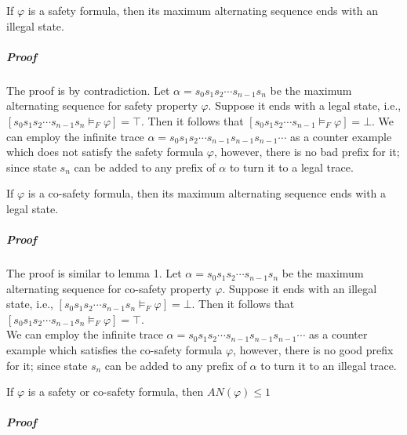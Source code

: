 

\begin{lemma}

If $\varphi$ is a safety formula, then its maximum alternating sequence ends with an illegal state. 

\end{lemma}

\subparagraph{Proof}
The proof is by contradiction. Let $\alpha = s_0s_1s_2 \cdots s_{n-1} s_n $ be the maximum alternating sequence for safety property $\varphi$. Suppose it ends with a legal state, i.e., $[s_0s_1s_2 \cdots s_{n-1} s_n \models_F \varphi] = \top$. Then it follows that $[s_0s_1s_2 \cdots s_{n-1} \models_F \varphi] = \bot$. We can employ the infinite trace $\alpha = s_0 s_1 s_2 \cdots s_{n-1} s_{n-1} s_{n-1} \cdots$ as a counter example which does not satisfy the safety formula $\varphi$, however, there is no bad prefix for it; since state $s_n$ can be added to any prefix of $\alpha$ to turn it to a legal trace.  

\begin{lemma}

If $\varphi$ is a co-safety formula, then its maximum alternating sequence ends with a legal state. 

\end{lemma}

\subparagraph{Proof}
The proof is similar to lemma 1. Let $\alpha = s_0s_1s_2 \cdots s_{n-1} s_n $ be the maximum alternating sequence for co-safety property $\varphi$. Suppose it ends with an illegal state, i.e., $[s_0s_1s_2 \cdots s_{n-1} s_n \models_F \varphi] = \bot$. Then it follows that $[s_0s_1s_2 \cdots s_{n-1} s_n \models_F \varphi] = \top$. \\
We can employ the infinite trace $\alpha = s_0 s_1 s_2 \cdots s_{n-1} s_{n-1} s_{n-1} \cdots$ as a counter example which satisfies the co-safety formula $\varphi$, however, there is no good prefix for it; since state $s_n$ can be added to any prefix of $\alpha$ to turn it to an illegal trace.  \\




\begin{theorem}

If $\varphi$ is a safety or co-safety formula, then $AN(\varphi) \leq 1$

\end{theorem} 

\subparagraph{Proof}

